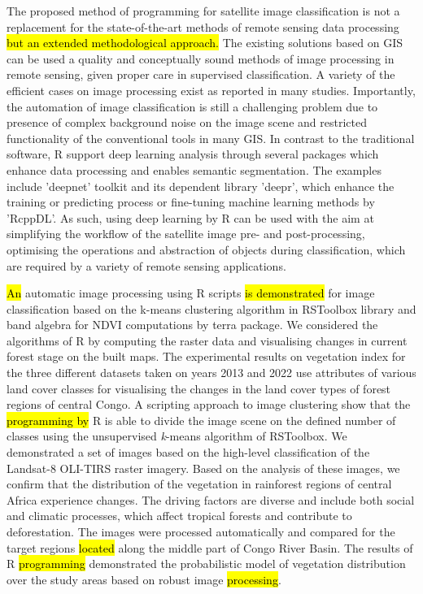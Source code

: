 \documentclass[applsci,article,submit,pdftex,moreauthors]{Definitions/mdpi}
\begin{document}
The proposed method of\hl{ }programming for satellite image classification is not a replacement for the state-of-the-art methods of remote sensing data processing\hl{ but an extended methodological approach. }The existing solutions based on GIS\hl{ }can be used a quality and conceptually sound methods of image processing in remote sensing, given proper care in supervised classification. A variety of the efficient cases on\hl{ }image\hl{ }processing exist as reported in many studies. Importantly,\hl{ }the automation of image classification is still a challenging problem due to presence of complex background noise on the image scene and restricted functionality of the conventional tools in many GIS. In contrast to the traditional software, R support deep learning analysis through several packages which enhance data processing and enables semantic segmentation. The examples include 'deepnet' toolkit and its dependent library 'deepr', which enhance the training or predicting process or fine-tuning machine learning methods by 'RcppDL'. As such, using deep learning by R can be used with the aim at simplifying the workflow of the satellite image pre- and post-processing, optimising the operations and abstraction of objects during classification, which are required by a variety of remote sensing applications.

\hl{An }automatic image processing using R scripts \hl{is demonstrated }for image classification based on the k-means clustering algorithm in RSToolbox library and band algebra for NDVI computations by terra package. We considered the algorithms of R by computing the raster data and visualising changes in current forest stage on the built maps. The experimental results on vegetation index for the three different datasets taken on years 2013 and 2022 use attributes of various land cover classes for visualising the changes in the land cover types of forest regions of central Congo. A scripting approach to image clustering show that the \hl{programming by} R is able to divide the image scene on the defined number of classes using the unsupervised \emph{k}-means algorithm of RSToolbox. We demonstrated a set of images based on the high-level classification of the Landsat-8 OLI-TIRS raster imagery. Based on the analysis of these images, we confirm that the distribution of the vegetation in rainforest regions of central Africa experience changes. The driving factors are diverse and include both social and climatic processes, which affect tropical forests and contribute to deforestation. The images were processed automatically and compared for the target regions \hl{located} along the middle part of Congo River Basin. The results of R \hl{programming} demonstrated the probabilistic model of vegetation distribution over the study areas based on robust image \hl{processing}. 
\end{document}
